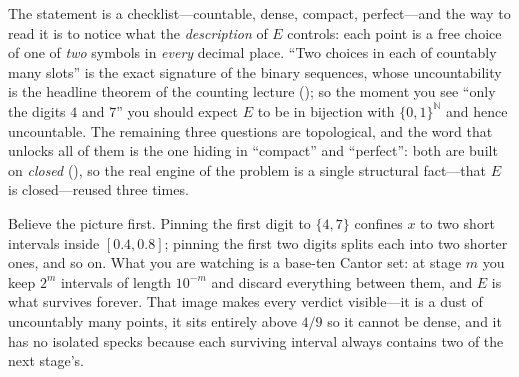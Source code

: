 \documentclass[main.tex]{subfiles}
\begin{document}
\begin{Reflection}
The statement is a checklist---countable, dense, compact, perfect---and the way to read it is to notice
what the \emph{description} of $E$ controls: each point is a free choice of one of \emph{two} symbols in
\emph{every} decimal place. ``Two choices in each of countably many slots'' is the exact signature of the
binary sequences, whose uncountability is the headline theorem of the counting lecture
(); so the moment you see ``only the digits $4$ and $7$'' you
should expect $E$ to be in bijection with $\{0,1\}^{\mathbb N}$ and hence uncountable. The remaining three
questions are topological, and the word that unlocks all of them is the one hiding in ``compact'' and
``perfect'': both are built on \emph{closed} (), so the real engine of the problem is a
single structural fact---that $E$ is closed---reused three times.

Believe the picture first. Pinning the first digit to $\{4,7\}$ confines $x$ to two short intervals
inside $[0.4,0.8]$; pinning the first two digits splits each into two shorter ones, and so on. What you
are watching is a base-ten Cantor set: at stage $m$ you keep $2^m$ intervals of length $10^{-m}$ and
discard everything between them, and $E$ is what survives forever. That image makes every verdict
visible---it is a dust of uncountably many points, it sits entirely above $4/9$ so it cannot be dense,
and it has no isolated specks because each surviving interval always contains two of the next stage's.


\end{Reflection}
\end{document}

